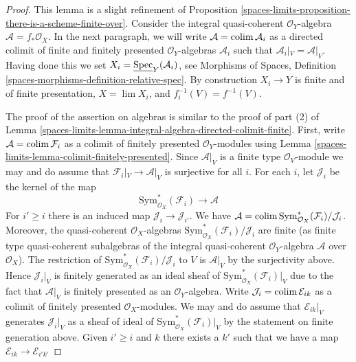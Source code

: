 \begin{proof}
This lemma is a slight refinement of Proposition
\ref{spaces-limits-proposition-there-is-a-scheme-finite-over}.
Consider the integral quasi-coherent $\mathcal{O}_Y$-algebra
$\mathcal{A} = f_*\mathcal{O}_X$. In the next paragraph, we will
write $\mathcal{A} = \operatorname{colim} \mathcal{A}_i$ as a directed
colimit of finite and finitely presented $\mathcal{O}_Y$-algebras
$\mathcal{A}_i$ such that $\mathcal{A}_i|_V = \mathcal{A}|_V$.
Having done this we set $X_i = \underline{\operatorname{Spec}}_Y(\mathcal{A}_i)$, see
Morphisms of Spaces, Definition
\ref{spaces-morphisms-definition-relative-spec}.
By construction $X_i \to Y$ is finite and of finite presentation,
$X = \lim X_i$, and $f_i^{-1}(V) = f^{-1}(V)$.

\medskip\noindent
The proof of the assertion on algebras is similar to
the proof of part (2) of
Lemma \ref{spaces-limits-lemma-integral-algebra-directed-colimit-finite}.
First, write $\mathcal{A} = \operatorname{colim} \mathcal{F}_i$
as a colimit of finitely presented $\mathcal{O}_Y$-modules using
Lemma \ref{spaces-limits-lemma-colimit-finitely-presented}.
Since $\mathcal{A}|_V$ is a finite type $\mathcal{O}_V$-module
we may and do assume that $\mathcal{F}_i|_V \to \mathcal{A}|_V$
is surjective for all $i$.
For each $i$, let $\mathcal{J}_i$ be the kernel of the map
$$
\text{Sym}^*_{\mathcal{O}_X}(\mathcal{F}_i) \longrightarrow \mathcal{A}
$$
For $i' \geq i$ there is an induced map $\mathcal{J}_i \to \mathcal{J}_{i'}$.
We have $\mathcal{A} =
\operatorname{colim} \text{Sym}^*_{\mathcal{O}_X}(\mathcal{F}_i)/\mathcal{J}_i$.
Moreover, the quasi-coherent $\mathcal{O}_X$-algebras
$\text{Sym}^*_{\mathcal{O}_X}(\mathcal{F}_i)/\mathcal{J}_i$
are finite (as finite type quasi-coherent subalgebras of the integral
quasi-coherent $\mathcal{O}_Y$-algebra $\mathcal{A}$ over $\mathcal{O}_X$).
The restriction of $\text{Sym}^*_{\mathcal{O}_X}(\mathcal{F}_i)/\mathcal{J}_i$
to $V$ is $\mathcal{A}|_V$ by the surjectivity above.
Hence $\mathcal{J}_i|_V$ is finitely generated as an ideal sheaf of
$\text{Sym}^*_{\mathcal{O}_X}(\mathcal{F}_i)|_V$ due to the
fact that $\mathcal{A}|_V$ is finitely presented as an
$\mathcal{O}_Y$-algebra.
Write $\mathcal{J}_i = \operatorname{colim} \mathcal{E}_{ik}$
as a colimit of finitely presented $\mathcal{O}_X$-modules.
We may and do assume that $\mathcal{E}_{ik}|_V$
generates $\mathcal{J}_i|_V$ as a sheaf of ideal of
$\text{Sym}^*_{\mathcal{O}_X}(\mathcal{F}_i)|_V$ by the
statement on finite generation above.
Given $i' \geq i$ and $k$ there exists a $k'$ such that we
have a map $\mathcal{E}_{ik} \to \mathcal{E}_{i'k'}$

\end{proof}
